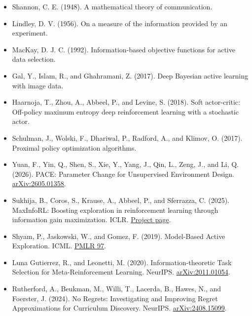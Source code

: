 \documentclass[11pt]{article}
\begin{document}
\begin{itemize}[leftmargin=*]
  \item Shannon, C. E. (1948). A mathematical theory of communication.
  \item Lindley, D. V. (1956). On a measure of the information provided by an
  experiment.
  \item MacKay, D. J. C. (1992). Information-based objective functions for
  active data selection.
  \item Gal, Y., Islam, R., and Ghahramani, Z. (2017). Deep Bayesian active
  learning with image data.
  \item Haarnoja, T., Zhou, A., Abbeel, P., and Levine, S. (2018). Soft
  actor-critic: Off-policy maximum entropy deep reinforcement learning with a
  stochastic actor.
  \item Schulman, J., Wolski, F., Dhariwal, P., Radford, A., and Klimov, O.
  (2017). Proximal policy optimization algorithms.
  \item Yuan, F., Yin, Q., Shen, S., Xie, Y., Yang, J., Qin, L., Zeng, J., and
  Li, Q. (2026). PACE: Parameter Change for Unsupervised Environment Design.
  \href{https://arxiv.org/abs/2605.01358}{arXiv:2605.01358}.
  \item Sukhija, B., Coros, S., Krause, A., Abbeel, P., and Sferrazza, C.
  (2025). MaxInfoRL: Boosting exploration in reinforcement learning through
  information gain maximization. ICLR.
  \href{https://sukhijab.github.io/projects/maxinforl/}{Project page}.
  \item Shyam, P., Jaskowski, W., and Gomez, F. (2019). Model-Based Active
  Exploration. ICML.
  \href{https://proceedings.mlr.press/v97/shyam19a.html}{PMLR 97}.
  \item Luna Gutierrez, R., and Leonetti, M. (2020). Information-theoretic Task
  Selection for Meta-Reinforcement Learning. NeurIPS.
  \href{https://arxiv.org/abs/2011.01054}{arXiv:2011.01054}.
  \item Rutherford, A., Beukman, M., Willi, T., Lacerda, B., Hawes, N., and
  Foerster, J. (2024). No Regrets: Investigating and Improving Regret
  Approximations for Curriculum Discovery. NeurIPS.
  \href{https://arxiv.org/abs/2408.15099}{arXiv:2408.15099}.
\end{itemize}
\end{document}
